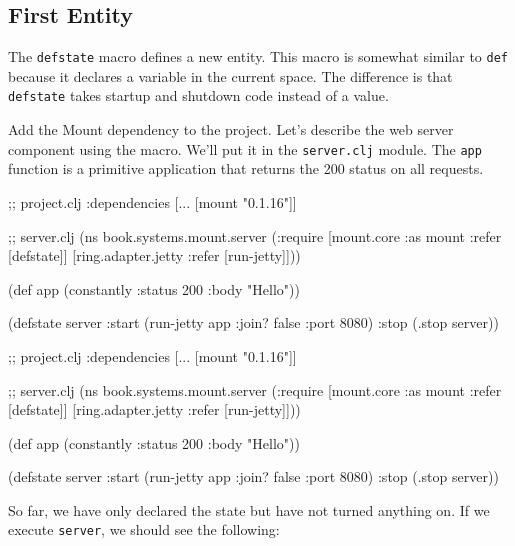 \subsection{First Entity}


The \verb|defstate| macro defines a new entity. This macro is somewhat similar to \verb|def| because it declares a variable in the current space. The difference is that \verb|defstate| takes startup and shutdown code instead of a value.

Add the Mount dependency to the project. Let's describe the web server component using the macro. We'll put it in the \verb|server.clj| module. The \verb|app| function is a primitive application that returns the 200 status on all requests.

\ifnarrow

\begin{english}
  \begin{clojure}
;; project.clj
:dependencies [... [mount "0.1.16"]]

;; server.clj
(ns book.systems.mount.server
  (:require
   [mount.core :as mount
    :refer [defstate]]
   [ring.adapter.jetty
    :refer [run-jetty]]))

(def app (constantly
           {:status 200 :body "Hello"}))

(defstate server
  :start (run-jetty app
           {:join? false :port 8080})
  :stop (.stop server))
  \end{clojure}
\end{english}

\else

\begin{english}
  \begin{clojure}
;; project.clj
:dependencies [... [mount "0.1.16"]]

;; server.clj
(ns book.systems.mount.server
  (:require
   [mount.core :as mount :refer [defstate]]
   [ring.adapter.jetty :refer [run-jetty]]))

(def app (constantly {:status 200 :body "Hello"}))

(defstate server
  :start (run-jetty app {:join? false :port 8080})
  :stop (.stop server))
  \end{clojure}
\end{english}

\fi

So far, we have only declared the state but have not turned anything on. If we execute \verb|server|, we should see the following:

